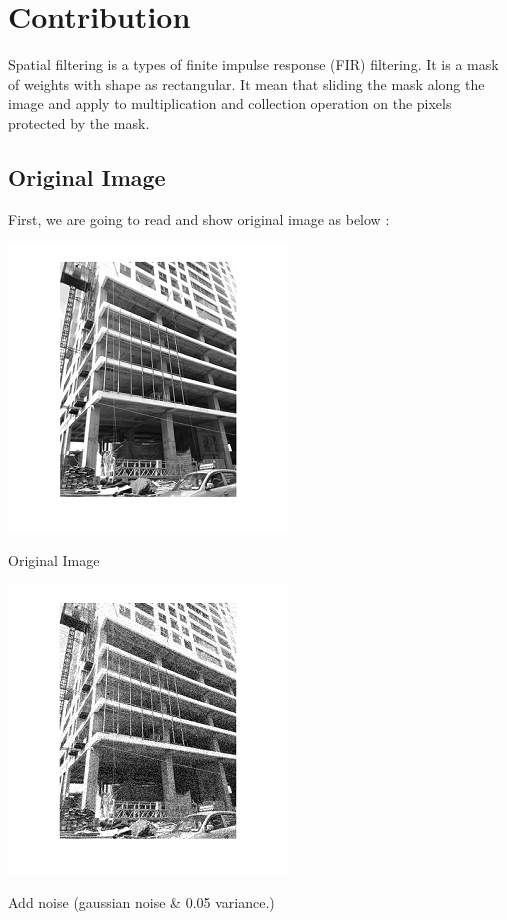 \chapter{Contribution}
Spatial filtering is a types of finite impulse response (FIR) filtering. It is a mask of weights with shape as rectangular. It mean that sliding the mask along the image and apply to multiplication and collection operation on the pixels protected by the mask. 

\section*{Original Image }
First, we are going to read and show original image as below :

\begin{center}
	\includegraphics{construction.png}

 Original Image

\includegraphics{noisec.png}

Add noise (gaussian noise \& 0.05 variance.)





\end{center}

